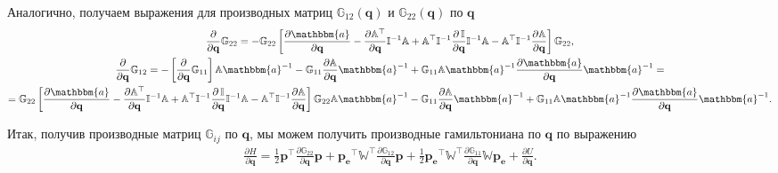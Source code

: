 \documentclass[12pt]{article}
\newcommand{\mf}{\mathbf}
\newcommand{\bbI}{\mathbb{I}}
\newcommand{\bba}{\mathbbm{a}}
\newcommand{\bbA}{\mathbb{A}}
\newcommand{\bbG}{\mathbb{G}}
\newcommand{\bbW}{\mathbb{W}}
\newcommand{\pe}{\mf{p_e}}
\begin{document}
Аналогично, получаем выражения для производных матриц $\bbG_{12}(\mf{q})$ и $\bbG_{22}(\mf{q})$ по $\mf{q}$
\begin{gather}
	\frac{\partial}{\partial \mf{q}} \bbG_{22} = -\bbG_{22} \left[ \frac{\partial \bba}{\partial \mf{q}} - \frac{\partial \bbA^\top}{\partial \mf{q}} \bbI^{-1} \bbA + \bbA^\top \bbI^{-1} \frac{\partial \, \bbI}{\partial \mf{q}} \bbI^{-1} \bbA - \bbA^\top \bbI^{-1} \frac{\partial \bbA}{\partial \mf{q}} \right] \bbG_{22}, \\
	\frac{\partial}{\partial \mf{q}} \bbG_{12} = - \left [ \frac{\partial}{\partial \mf{q}} \bbG_{11} \right] \bbA \bba^{-1} - \bbG_{11} \frac{\partial \bbA}{\partial \mf{q}} \bba^{-1} + \bbG_{11} \bbA \bba^{-1} \frac{\partial \bba}{\partial \mf{q}} \bba^{-1} = \\
	= \bbG_{22} \left[ \frac{\partial \bba}{\partial \mf{q}} - \frac{\partial \bbA^\top}{\partial \mf{q}} \bbI^{-1} \bbA + \bbA^\top \bbI^{-1} \frac{\partial \, \bbI}{\partial \mf{q}} \bbI^{-1} \bbA - \bbA^\top \bbI^{-1} \frac{\partial \bbA}{\partial \mf{q}} \right] \bbG_{22} \bbA \bba^{-1} - \bbG_{11} \frac{\partial \bbA}{\partial \mf{q}} \bba^{-1} + \bbG_{11} \bbA \bba^{-1} \frac{\partial \bba}{\partial \mf{q}} \bba^{-1}. 
\end{gather}

Итак, получив производные матриц $\bbG_{ij}$ по $\mf{q}$, мы можем получить производные гамильтониана по $\mf{q}$ по выражению
\begin{gather}
	\frac{\partial H}{\partial \mf{q}} = \frac{1}{2} \mf{p}^\top \frac{\partial \bbG_{22}}{\partial \mf{q}} \mf{p} + \pe^\top \bbW^\top \frac{\partial \bbG_{12}}{\partial \mf{q}} \mf{p} + \frac{1}{2} \pe^\top \bbW^\top \frac{\partial \bbG_{11}}{\partial \mf{q}} \bbW \pe + \frac{\partial U}{\partial \mf{q}}.
\end{gather}
\end{document}

